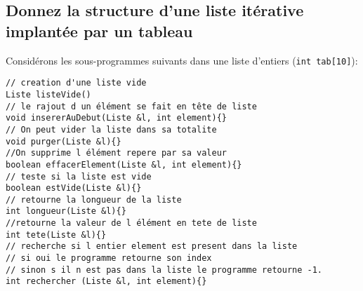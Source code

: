 \documentclass[french]{article}
\begin{document}
	\subsection{Donnez la structure d’une liste itérative implantée par un tableau}
	Considérons les sous-programmes suivants dans une liste d’entiers (\texttt{int tab[10]}):
\begin{lstlisting}[caption={Liste des opérations dans une liste d’entiers}]
// creation d'une liste vide 
Liste listeVide()
// le rajout d un élément se fait en tête de liste
void insererAuDebut(Liste &l, int element){} 
// On peut vider la liste dans sa totalite
void purger(Liste &l){} 
//On supprime l élément repere par sa valeur
boolean effacerElement(Liste &l, int element){}
// teste si la liste est vide
boolean estVide(Liste &l){} 
// retourne la longueur de la liste
int longueur(Liste &l){}
//retourne la valeur de l élément en tete de liste
int tete(Liste &l){}
// recherche si l entier element est present dans la liste 
// si oui le programme retourne son index 
// sinon s il n est pas dans la liste le programme retourne -1.
int rechercher (Liste &l, int element){}  
\end{lstlisting}
	
	
\end{document}
